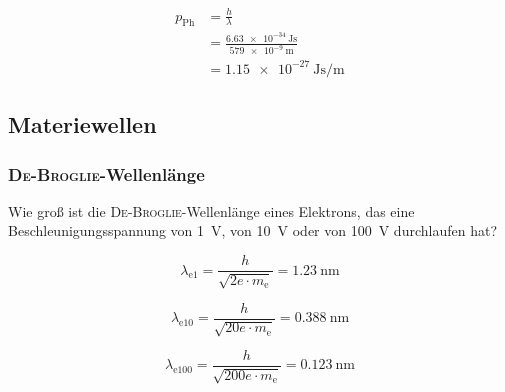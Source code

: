 \documentclass{ajc}
\begin{document}
	\begin{equation}
		\begin{split}
			p_\text{Ph} &= \frac{h}{\lambda} \\
						&= \frac{\SI{6,63e-34}{\J\s}}{\SI{579e-9}{\m}} \\
						&= \SI{1,15e-27}{\J\s\per\m}
		\end{split}
	\end{equation}
	
	\newpage
	
	\subsection{Materiewellen}
	
	\subsubsection{\textsc{D\lowercase{e}-B\lowercase{roglie}}-Wellenlänge}
	Wie groß ist die \textsc{De-Broglie}-Wellenlänge eines Elektrons, das eine Beschleunigungsspannung von \SI{1}{\volt}, von \SI{10}{\volt} oder von \SI{100}{\volt} durchlaufen hat?
	
	\begin{equation}
		\lambda_\text{e1} = \frac{h}{\sqrt{2e \cdot m_\text{e}}} = \SI{1,23}{\nm}
	\end{equation}
	
	\begin{equation}
		\lambda_\text{e10} = \frac{h}{\sqrt{20e \cdot m_\text{e}}} = \SI{0,388}{\nm}
	\end{equation}
	
	\begin{equation}
		\lambda_\text{e100} = \frac{h}{\sqrt{200e \cdot m_\text{e}}} = \SI{0,123}{\nm}
	\end{equation}
\end{document}
